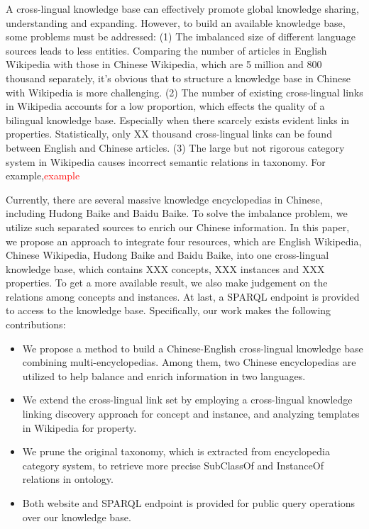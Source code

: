 \documentclass[runningheads,a4paper]{llncs}
\begin{document}
A cross-lingual knowledge base can effectively promote global knowledge sharing, understanding and expanding. However, to build an available knowledge base, some problems must be addressed: (1) The imbalanced size of different language sources leads to less entities. Comparing the number of articles in English Wikipedia with those in Chinese Wikipedia, which are 5 million and 800 thousand separately, it's obvious that to structure a knowledge base in Chinese with Wikipedia is more challenging. (2) The number of existing cross-lingual links in Wikipedia accounts for a low proportion, which effects the quality of a bilingual knowledge base. Especially when there scarcely exists evident links in properties. Statistically, only XX thousand cross-lingual links can be found between English and Chinese articles. (3) The large but not rigorous category system in Wikipedia causes incorrect semantic relations in taxonomy. For example,\textcolor{red}{example}



Currently, there are several massive knowledge encyclopedias in Chinese, including Hudong Baike and Baidu Baike. To solve the imbalance problem, we utilize such separated sources to enrich our Chinese information. In this paper, we propose an approach to integrate four resources, which are English Wikipedia, Chinese Wikipedia, Hudong Baike and Baidu Baike, into one cross-lingual knowledge base, which contains XXX concepts, XXX instances and XXX properties. To get a more available result, we also make judgement on the relations among concepts and instances. At last, a SPARQL endpoint is provided to access to the knowledge base. Specifically, our work makes the following contributions:
\begin{itemize}
  \item We propose a method to build a Chinese-English cross-lingual knowledge base combining multi-encyclopedias. Among them, two  Chinese encyclopedias are utilized to help balance and enrich information in two languages.
  \item We extend the cross-lingual link set by employing a cross-lingual knowledge linking discovery approach for concept and instance, and analyzing templates in Wikipedia for property.
  \item We prune the original taxonomy, which is extracted from encyclopedia category system, to retrieve more precise SubClassOf and InstanceOf relations in ontology.
  \item Both website and SPARQL endpoint is provided for public query operations over our knowledge base.
\end{itemize}
\end{document}
